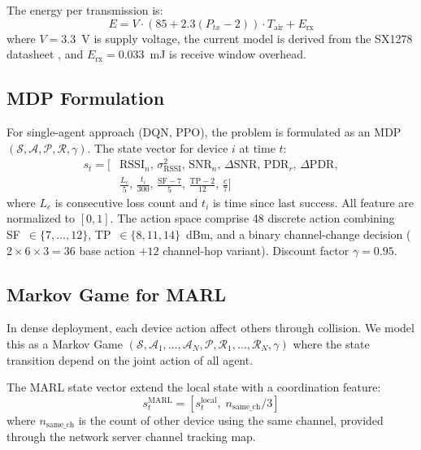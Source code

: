 \documentclass[conference]{IEEEtran}
\begin{document}
The energy per transmission is:
\begin{equation}
    E = V \cdot (85 + 2.3(P_{tx} - 2)) \cdot T_{\text{air}} + E_{\text{rx}}
    \label{eq:energy}
\end{equation}
where $V = 3.3$~V is supply voltage, the current model is derived from the SX1278 datasheet \cite{semtech_sx1278}, and $E_{\text{rx}} = 0.033$~mJ is receive window overhead.

\subsection{MDP Formulation}

For single-agent approach (DQN, PPO), the problem is formulated as an MDP $(\mathcal{S}, \mathcal{A}, \mathcal{P}, \mathcal{R}, \gamma)$. The state vector for device $i$ at time $t$:
\begin{align}
    s_t = \big[&\text{RSSI}_n,\, \sigma^2_{\text{RSSI}},\, \text{SNR}_n,\, \Delta\text{SNR},\, \text{PDR}_r,\, \Delta\text{PDR}, \nonumber\\
    &\tfrac{L_c}{5},\, \tfrac{t_i}{300},\, \tfrac{\text{SF}-7}{5},\, \tfrac{\text{TP}-2}{12},\, \tfrac{c}{7}\big]
\end{align}
where $L_c$ is consecutive loss count and $t_i$ is time since last success. All feature are normalized to $[0, 1]$. The action space comprise 48 discrete action combining SF~$\in\{7,\ldots,12\}$, TP~$\in\{8, 11, 14\}$~dBm, and a binary channel-change decision ($2 \times 6 \times 3 = 36$ base action $+ 12$ channel-hop variant). Discount factor $\gamma = 0.95$.

\subsection{Markov Game for MARL}

In dense deployment, each device action affect others through collision. We model this as a Markov Game $(\mathcal{S}, \mathcal{A}_1, \ldots, \mathcal{A}_N, \mathcal{P}, \mathcal{R}_1, \ldots, \mathcal{R}_N, \gamma)$ where the state transition depend on the joint action of all agent.

The MARL state vector extend the local state with a coordination feature:
\begin{equation}
    s_t^{\text{MARL}} = \left[s_t^{\text{local}},\; n_{\text{same\_ch}} / 3\right]
\end{equation}
where $n_{\text{same\_ch}}$ is the count of other device using the same channel, provided through the network server channel tracking map.
\end{document}

